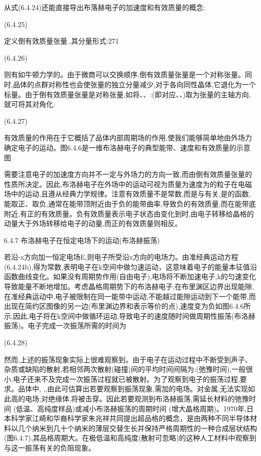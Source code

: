 从式(6.4.24)还能直接导出布落赫电子的加速度和有效质量的概念:

 	(6.4.25)

定义倒有效质量张量.,其分量形式:271

 (6.4.26)

则有如牛顿力学的。由于微商可以交换顺序,倒有效质量张量是一个对称张量。同时,品体的点群对称性也会使张量的独立分量减少,对于各向同性晶体,它退化为一个标量。由于倒有效质量张量是对称张量,如将、、:(即对应、、)取为张量的主轴方向,就可将其对角化:

 	(6.4.27)

有效质量的作用在于它概括了品体内部周期场的作用,使我们能够简单地由外场力确定电子的运动。图6.4.6是一维布洛赫电子的典型能带、速度和有效质量的示意图



需要注意电子的加速度方向并不一定与外场力的方向一致,而由倒有效质量张量的性质所决定。因此,布洛赫电子在外场中的运动可视为质量为速度为的粒子在电磁场中的运动,且遵从经典力学规律。注意有效质量不是常数,而是与有关,是的函数,能取正、取负,通常在能带顶附近由于负的能带曲率,导致负的有效质量,而在能带底附近,有正的有效质量。负有效质量表示电子状态由变化到时,由电子转移给晶格的动量大于外场转移给电子的动量,而正的有效质量则相反。

6.4.7 布洛赫电子在恒定电场下的运动(布洛赫振荡)

若沿-x方向加一恒定电场E,则电子所受沿x方向的电场力。由准经典运动方程(6.4.24b),得为常数,表明电子在k空间中做匀速运动，这意味着电子的能量本征值沿函数曲线变化。如果没有周期势作用(自由电子),电场将不断加速电子,k的匀速变化导致能量不断地增加。考虑晶格周期势下的布洛赫电子,在布里渊区边界出现能隙,在准经典运动中,电子被限制在同一能带中运动,不能越过能隙运动到下一个能带,而出现在简约区图像的另一边(布里渊边界和表示等价的点),速度变为负如图6.4.6所示,因此,电子将在k空间中做循环运动,导致电子的速度随时间做周期性振荡(布洛赫振荡)。电子完成一次振荡所需的时间为

 	(6.4.28)



然而,上述的振荡现象实际上很难观察到。由于电子在运动过程中不断受到声子、杂质或缺陷的散射,若相邻两次散射(碰撞)间的平均时间间隔为:(弛豫时间),一般很小,电子还来不及完成一次振荡过程就已被散射。为了观察到电子的振荡过程,要求。品体中, ,,由此可估算出若要观察到振荡现象,需加的电场。对金属,无法实现如此高的电场;对绝缘体,将被击穿。因此若要观测到布洛赫振荡,需延长材料的弛豫时间 (低温、高纯度样品)或减小布洛赫振荡的周期时间 (增大晶格周期)。1970年,日本科学家江崎和华裔科学家朱兆祥共同提出超品格的概念，是由两种不同半导体材料以几个纳米到几十个纳米的薄层交替生长并保持严格周期性的一种合成层状结构(图6.4.7),其品格周期大。在极低温和高纯度(散射可忽略)的这种人工材料中观察到与这一振荡有关的负阻现象。

